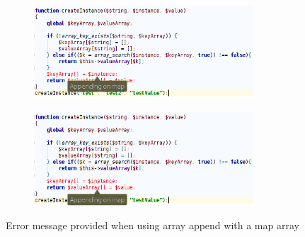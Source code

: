 \begin{figure}
\centering
\begin{subfigure}{\textwidth}
\centering
\includegraphics[width=0.9\textwidth]{chapters/caseStudy/newScreens/instance1}
\end{subfigure}
\begin{subfigure}{\textwidth}
\centering
\includegraphics[width=0.9\textwidth]{chapters/caseStudy/newScreens/instance2}
\end{subfigure}
\caption{Error message provided when using array append with a map array}
\label{fig:typeHandlerScreenshot}
\end{figure}

